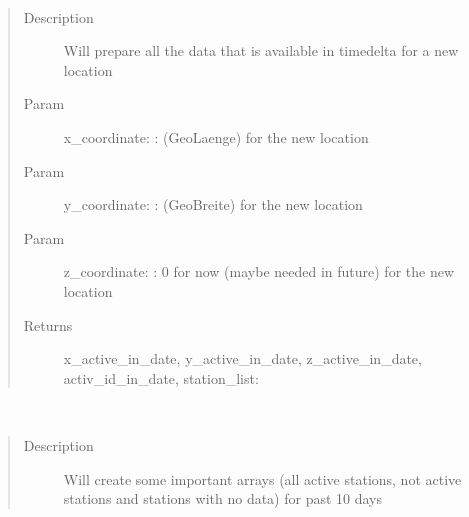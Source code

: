 \documentclass[letterpaper,10pt,english]{sphinxmanual}
\begin{document}
\begin{fulllineitems}
\begin{fulllineitems}
\end{fulllineitems}


\begin{fulllineitems}
\label{\detokenize{DwdDataPrep:DwdDataPrep.Reader.data_prep_for_new_location}}~\begin{quote}\begin{description}
\item[{Description}] \leavevmode
\sphinxAtStartPar
Will prepare all the data that is available in timedelta for a new location

\item[{Param}] \leavevmode
\sphinxAtStartPar
x\_coordinate: : (GeoLaenge) for the new location

\item[{Param}] \leavevmode
\sphinxAtStartPar
y\_coordinate: : (GeoBreite) for the new location

\item[{Param}] \leavevmode
\sphinxAtStartPar
z\_coordinate: : 0 for now (maybe needed in future) for the new location

\item[{Returns}] \leavevmode
\sphinxAtStartPar
x\_active\_in\_date, y\_active\_in\_date, z\_active\_in\_date, activ\_id\_in\_date, station\_list: 

\end{description}\end{quote}

\end{fulllineitems}


\begin{fulllineitems}
\label{\detokenize{DwdDataPrep:DwdDataPrep.Reader.get_active_stations}}~\begin{quote}\begin{description}
\item[{Description}] \leavevmode
\sphinxAtStartPar
Will create some important arrays (all active stations, not active stations and stations with no data) for past 10 days


\end{description}
\end{quote}
\end{fulllineitems}
\end{fulllineitems}
\end{document}

